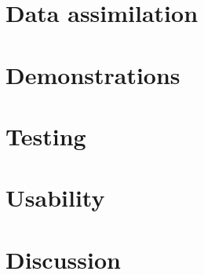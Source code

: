 \documentclass{article}
\theoremstyle{definition}
\theoremstyle{plain}
\begin{document}
\section{Data assimilation}


\section{Demonstrations}


\section{Testing}


\section{Usability}


\section{Discussion}



\end{document}
